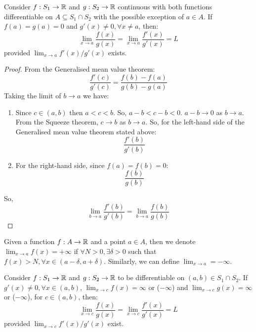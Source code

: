 \begin{theorem}
    Consider $f: S_1 \to \mathbb{R}$ and $g: S_2 \to \mathbb{R}$ continuous with both functions differentiable on $A \subseteq S_1 \cap S_2$ with the possible exception of $a \in A$. If $f(a) = g(a) = 0$ and $g'(x) \neq 0, \forall x \neq a$, then:
    \begin{equation*}
        \lim \limits_{x \to a} \frac{f(x)}{g(x)} = \lim \limits_{x \to a} \frac{f'(x)}{g'(x)} =  L
    \end{equation*}
    provided $\lim_{x \to a} f'(x)/g'(x)$ exists. 
\end{theorem}

\begin{proof}
    From the Generalised mean value theorem:
    \begin{equation*}
        \frac{f'(c)}{g'(c)} = \frac{f(b) - f(a)}{g(b) - g(a)}
    \end{equation*}
    Taking the limit of $b \to a$ we have:
    \begin{enumerate}
        \item Since $c \in (a,b)$ then $a < c < b$. So, $a - b < c - b < 0$. $a - b \to 0$ as $ b \to a$. From the Squeeze theorem, $c \to b$ as $b \to a$. So, for the left-hand side of the Generalised mean value theorem stated above:
            \begin{equation*}
                \frac{f'(b)}{g'(b)}
            \end{equation*}
        \item For the right-hand side, since $f(a) = f(b) = 0$:
            \begin{equation*}
                \frac{f(b)}{g(b)}
            \end{equation*}
    \end{enumerate}
    So, 
    \begin{equation*}
        \lim \limits_{b \to a} \frac{f'(b)}{g'(b)} = \lim \limits_{b \to a} \frac{f(b)}{g(b)}
    \end{equation*}
\end{proof}

\begin{definition}
    Given a function $f: A \to \mathbb{R}$ and a point $a \in A$, then we denote $\lim_{x \to a} f(x) = +\infty$ if $\forall N > 0, \exists \delta > 0$ such that $f(x) > N, \forall x \in (a - \delta, a + \delta)$.
    Similarly, we can define $\lim_{x \to a} = - \infty$.
\end{definition}

\begin{theorem}
    Consider $f: S_1 \to \mathbb{R}$ and $g: S_2 \to \mathbb{R}$ to be differentiable on $(a,b) \in S_1 \cap S_2$. If $g'(x) \neq 0, \forall x \in (a,b)$, $\lim_{x \to c} f(x)= \infty$ or ($-\infty$) and $\lim_{x \to c} g(x) = \infty$ or ($-\infty$), for $c \in (a,b)$, then:
    \begin{equation*}
        \lim \limits_{x \to c} \frac{f(x)}{g(x)} = \lim \limits_{x \to c} \frac{f'(x)}{g'(x)} = L
    \end{equation*}
    provided $\lim_{x \to c} f'(x)/g'(x)$ exist.
\end{theorem}

